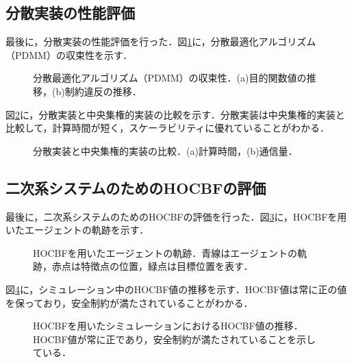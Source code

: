 \subsection{分散実装の性能評価}

最後に，分散実装の性能評価を行った．図\ref{fig:distributed_convergence}に，分散最適化アルゴリズム（PDMM）の収束性を示す．

\begin{figure}[htbp]
    \centering
    \caption{分散最適化アルゴリズム（PDMM）の収束性．(a)目的関数値の推移，(b)制約違反の推移．}
    \label{fig:distributed_convergence}
\end{figure}

図\ref{fig:distributed_vs_centralized}に，分散実装と中央集権的実装の比較を示す．分散実装は中央集権的実装と比較して，計算時間が短く，スケーラビリティに優れていることがわかる．

\begin{figure}[htbp]
    \centering
    \caption{分散実装と中央集権的実装の比較．(a)計算時間，(b)通信量．}
    \label{fig:distributed_vs_centralized}
\end{figure}

\subsection{二次系システムのためのHOCBFの評価}

最後に，二次系システムのためのHOCBFの評価を行った．図\ref{fig:hocbf_trajectory}に，HOCBFを用いたエージェントの軌跡を示す．

\begin{figure}[htbp]
    \centering
    \caption{HOCBFを用いたエージェントの軌跡．青線はエージェントの軌跡，赤点は特徴点の位置，緑点は目標位置を表す．}
    \label{fig:hocbf_trajectory}
\end{figure}

図\ref{fig:hocbf_cbf_value}に，シミュレーション中のHOCBF値の推移を示す．HOCBF値は常に正の値を保っており，安全制約が満たされていることがわかる．

\begin{figure}[htbp]
    \centering
    \caption{HOCBFを用いたシミュレーションにおけるHOCBF値の推移．HOCBF値が常に正であり，安全制約が満たされていることを示している．}
    \label{fig:hocbf_cbf_value}
\end{figure}

